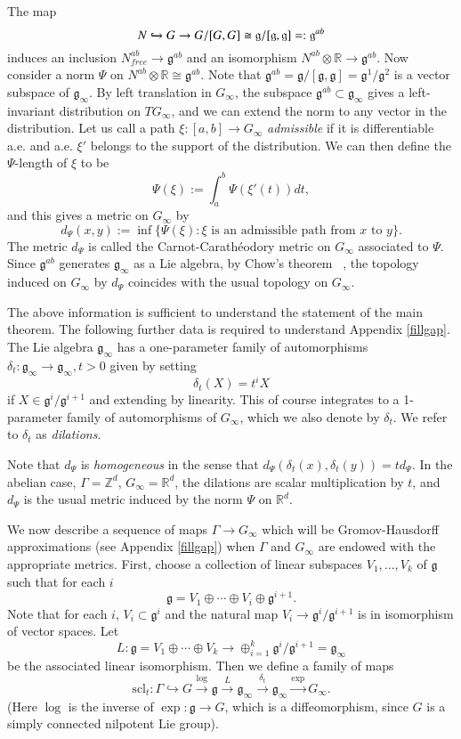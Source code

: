 \documentclass[12pt,reqno]{article}
\numberwithin{equation}{section}
\newcommand{\R}{\mathbb{R}}
\newcommand{\Z}{\mathbb{Z}}
\newcommand{\g}{\mathfrak{g}}
\newcommand{\scl}{\mathrm{scl}}
\begin{document}
 The map 
 \[ N \xhookrightarrow{} G \to G/[G,G] \cong \g/[\g,\g] =: \g^{ab} \]
 induces an inclusion $N^{ab}_{free} \to \g^{ab}$ and an isomorphism $N^{ab} \otimes \R \to \g^{ab}$.
 Now consider a norm $\Psi$ on $N^{ab} \otimes \R \cong \g^{ab}$.
 Note that $\g^{ab} = \g/[\g,\g]=\g^1/\g^2$ is a vector subspace of $\g_{\infty}$. 
 By left translation
 in $G_{\infty}$, the subspace $\g^{ab} \subset \g_{\infty}$ gives a left-invariant distribution on $TG_{\infty}$,
 and we can extend the norm to any vector in the distribution. Let us call a path 
 $\xi:[a,b] \to G_{\infty}$ \emph{admissible} if it is differentiable a.e. and a.e. $\xi'$ belongs to the support of the distribution. 
 We can then define the $\Psi$-length of $\xi$ to be
 \[ \Psi(\xi) := \int_a^b \Psi(\xi'(t)) dt, \]
 and this gives a metric on $G_{\infty}$ by
 \begin{equation}\label{met:CC}
  d_{\Psi}(x,y) := \inf \{ \Psi(\xi) : \xi \mbox{ is an admissible path from } x \mbox{ to } y \}. 
  \end{equation}
 The metric $d_{\Psi}$ is called the Carnot-Carath\'eodory metric on $G_{\infty}$ associated to $\Psi$.
 Since $\g^{ab}$ generates $\g_{\infty}$ as a Lie algebra, by Chow's theorem ~\cite{GromovCC},
 the topology induced on $G_{\infty}$ by $d_{\Psi}$ coincides with the usual topology on $G_{\infty}$.
 
 The above information is sufficient to understand the statement of the main theorem. The following further data is 
 required to understand Appendix \ref{fillgap}.
 The Lie algebra $\g_{\infty}$ has a one-parameter family of automorphisms $\delta_t : \g_{\infty} \to \g_{\infty}, t > 0$ given by setting
 \[ \delta_t(X) = t^i X\]
 if $X \in \g^i / \g^{i+1}$ and extending by linearity. This of course integrates to a 1-parameter family of automorphisms of $G_{\infty}$,
 which we also denote by $\delta_t$. We refer to $\delta_t$ as \emph{dilations}.
 
 Note that $d_{\Psi}$ is \emph{homogeneous} in the sense that $d_{\Psi}(\delta_t(x), \delta_t(y)) = t d_{\Psi}$.
 In the abelian case, $\Gamma = \Z^d$, $G_{\infty} = \R^d$, the dilations are scalar multiplication by $t$,
 and $d_{\Psi}$ is the usual metric induced by the norm $\Psi$ on $\R^d$.
 
 We now describe a sequence of maps $\Gamma \to G_{\infty}$ which will be Gromov-Hausdorff approximations 
 (see Appendix \ref{fillgap})
 when $\Gamma$ and 
 $G_{\infty}$ are endowed with the appropriate metrics. First, choose a collection of linear subspaces $V_1,...,V_k$ of $\g$ such that for each $i$
 \[ \g = V_1 \oplus \cdots \oplus V_i \oplus \g^{i+1}. \]
 Note that for each $i$, $V_i \subset \g^i$ and the natural map $V_i \to \g^i/\g^{i+1}$ is in isomorphism of vector spaces. Let
 \[ L : \g = V_1 \oplus \cdots \oplus V_k \to \oplus_{i = 1}^k \g^i/\g^{i+1} = \g_{\infty} \]
 be the associated linear isomorphism. Then we define a family of maps
 \[ \scl_t : \Gamma \hookrightarrow G \xrightarrow{\log} \g \xrightarrow{L} \g_{\infty} \xrightarrow{\delta_t} \g_{\infty} \xrightarrow{\exp} G_{\infty}. \]
 (Here $\log$ is the inverse of $\exp: \g \to G$, which is a diffeomorphism, since $G$ is a simply connected nilpotent Lie group).
  
\end{document}
